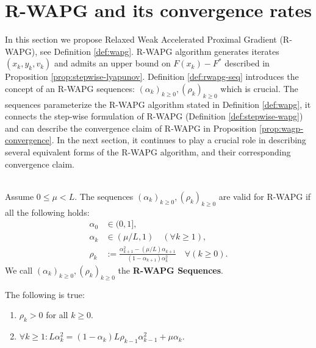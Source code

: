 \documentclass[12pt]{article}
\begin{document}
\section{R-WAPG and its convergence rates}\label{sec:rwapg-formulation-convergence}
    In this section we propose Relaxed Weak Accelerated Proximal Gradient (R-WAPG), see Definition \ref{def:wapg}.
    R-WAPG algorithm generates iterates $(x_k, y_k, v_k)$ and admits an upper bound on $F(x_k) - F^*$ described in Proposition \ref{prop:stepwise-lyapunov}. 
    Definition \ref{def:rwapg-seq} introduces the concept of an R-WAPG sequences: $(\alpha_k)_{k \ge 0}, (\rho_k)_{k \ge 0}$ which is crucial.
    The sequences parameterize the R-WAPG algorithm stated in Definition \ref{def:wapg}, it connects the step-wise formulation of R-WAPG (Definition \ref{def:stepwise-wapg}) and can describe the convergence claim of R-WAPG in Proposition \ref{prop:wagp-convergence}. 
    In the next section, it continues to play a crucial role in describing several equivalent forms of the R-WAPG algorithm, and their corresponding convergence claim. 
    \begin{definition}\label{def:rwapg-seq}\;\\
        Assume $0 \le \mu < L$. 
        The sequences $(\alpha_k)_{k \ge 0}, (\rho_k)_{k \ge 0}$ are valid for R-WAPG if all the following holds: 
        \begin{align*}
            \alpha_0 &\in (0, 1], 
            \\
            \alpha_k &\in (\mu/L, 1) \quad (\forall k \ge 1), 
            \\
            \rho_k &:= \frac{\alpha_{k + 1}^2 - (\mu/L)\alpha_{k + 1}}{(1 - \alpha_{k + 1})\alpha_k^2} \quad \forall (k \ge 0). 
        \end{align*}
        We call $(\alpha_k)_{k \ge 0}, (\rho_k)_{k \ge 0}$ the \textbf{R-WAPG Sequences}. 
    \end{definition}
    \begin{observation}\label{obs:r-wapg-observation-1}
        The following is true: 
        \begin{enumerate}
            \item $\rho_k > 0$ for all $k \ge 0$. 
            \item $\forall k \ge 1: L\alpha_k^2 = (1 - \alpha_k)L\rho_{k - 1}\alpha_{k - 1}^2 +\mu\alpha_k$. 
        \end{enumerate}
        
    \end{observation}
\end{document}
